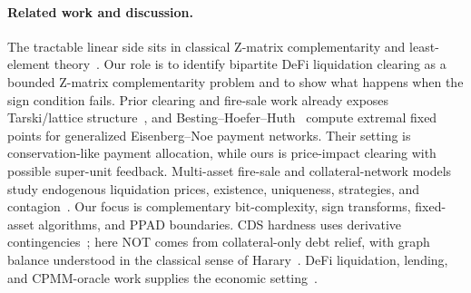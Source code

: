 \documentclass{llncs}
\begin{document}
\paragraph{Related work and discussion.}
The tractable linear side sits in classical Z-matrix complementarity and least-element theory~\cite{Mangasarian1976,Chandrasekaran1970,Pang1979,Ahn1983,PangChandrasekaran1985,CottlePangStone1992}. Our role is to identify bipartite DeFi liquidation clearing as a bounded Z-matrix complementarity problem and to show what happens when the sign condition fails. Prior clearing and fire-sale work already exposes Tarski/lattice structure~\cite{EisenbergNoe2001,RogersVeraart2013,BertschingerHoeferKrogmannLenznerSchuldenzuckerWilhelmi2023}, and Besting--Hoefer--Huth~\cite{BestingHoeferHuth2026} compute extremal fixed points for generalized Eisenberg--Noe payment networks. Their setting is conservation-like payment allocation, while ours is price-impact clearing with possible super-unit feedback. Multi-asset fire-sale and collateral-network models study endogenous liquidation prices, existence, uniqueness, strategies, and contagion~\cite{Feinstein2017,Feinstein2019,BanerjeeFeinstein2021,PangVeraart2026}. Our focus is complementary bit-complexity, sign transforms, fixed-asset algorithms, and PPAD boundaries. CDS hardness uses derivative contingencies~\cite{SchuldenzuckerSeukenBattiston2017,DohnHansenKlinkby2024}; here NOT comes from collateral-only debt relief, with graph balance understood in the classical sense of Harary~\cite{Harary1953}. DeFi liquidation, lending, and CPMM-oracle work supplies the economic setting~\cite{Perez2021,Qin2021,LeharParlour2022,TianZhu2025,BartolettiLipparini2025,SadeghiFeinstein2026}.
\end{document}
